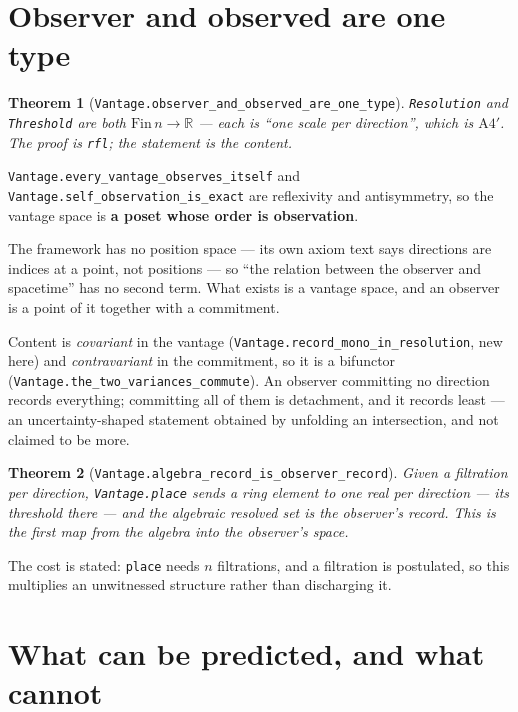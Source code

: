 \documentclass[11pt,a4paper]{article}
\newtheorem{theorem}{Theorem}[section]
\theoremstyle{definition}
\theoremstyle{remark}
\newcommand{\lean}[1]{\texttt{\small #1}}
\newcommand{\Afour}{\ensuremath{\mathrm{A4}'}}
\begin{document}
\section{Observer and observed are one type}
\label{sec:vantage}

\begin{theorem}[\lean{Vantage.observer\_and\_observed\_are\_one\_type}]
\lean{Resolution} and \lean{Threshold} are both $\mathrm{Fin}\,n\to\mathbb{R}$ ---
each is ``one scale per direction'', which is \Afour{}. The proof is \lean{rfl};
the statement is the content.
\end{theorem}

\lean{Vantage.every\_vantage\_observes\_itself} and
\lean{Vantage.self\_observation\_is\_exact} are reflexivity and antisymmetry, so
the vantage space is \textbf{a poset whose order is observation}.

\begin{claimbox}
The framework has no position space --- its own axiom text says directions are
indices at a point, not positions --- so ``the relation between the observer and
spacetime'' has no second term. What exists is a vantage space, and an observer is
a point of it together with a commitment.
\end{claimbox}

Content is \emph{covariant} in the vantage
(\lean{Vantage.record\_mono\_in\_resolution}, new here) and \emph{contravariant} in
the commitment, so it is a bifunctor
(\lean{Vantage.the\_two\_variances\_commute}). An observer committing no direction
records everything; committing all of them is detachment, and it records least ---
an uncertainty-shaped statement obtained by unfolding an intersection, and not
claimed to be more.

\begin{theorem}[\lean{Vantage.algebra\_record\_is\_observer\_record}]
Given a filtration \emph{per direction}, \lean{Vantage.place} sends a ring element
to one real per direction --- its threshold there --- and the algebraic resolved
set \emph{is} the observer's record. This is the first map from the algebra into
the observer's space.
\end{theorem}

The cost is stated: \lean{place} needs $n$ filtrations, and a filtration is
postulated, so this multiplies an unwitnessed structure rather than discharging it.

\section{What can be predicted, and what cannot}
\label{sec:predict}
\end{document}
